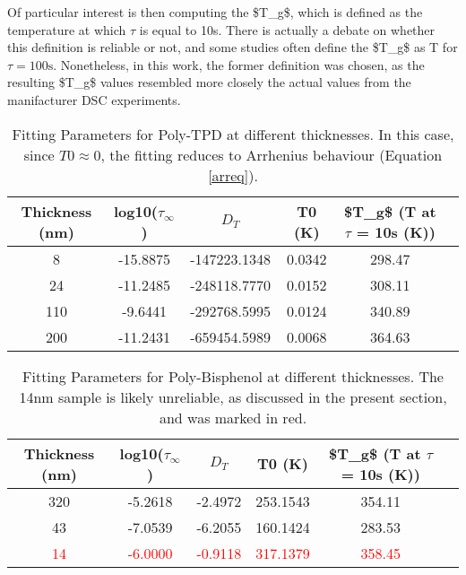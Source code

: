 Of particular interest is then computing the \ac{$T_g$}, which is defined as the temperature at which $\tau$ is equal to 10s.  There is actually a debate on whether this definition is reliable or not, and some studies often define the \ac{$T_g$} as T for $\tau = \text{100s}$. Nonetheless, in this work, the former definition was chosen, as the resulting \ac{$T_g$} values resembled more closely the actual values from the manifacturer \ac{DSC} experiments. %


\begin{table}[h]
	\caption{Fitting Parameters for Poly-TPD at different thicknesses. In this case, since $T0 \approx 0$, the fitting reduces to Arrhenius behaviour (Equation \ref{arreq}).}
    \label{tab:fitting-parameters-ptpd}
    \begin{center}
    \begin{tabular}{@{}cccccc@{}}
    \toprule
    Thickness (nm) & log10($\tau_\infty$) & $D_T$ & T0 (K) & \ac{$T_g$} (T at $\tau$ = 10s (K)) \\ \midrule
    8   & -15.8875 & -147223.1348 & 0.0342 & 298.47 \\
    24  & -11.2485 & -248118.7770 & 0.0152 & 308.11 \\
    110 & -9.6441 & -292768.5995 & 0.0124 & 340.89 \\
    200 & -11.2431 & -659454.5989 & 0.0068 & 364.63 \\
    \bottomrule
    \end{tabular}
    \end{center}
\end{table}



\begin{table}[h]
    \caption{Fitting Parameters for Poly-Bisphenol at different thicknesses. The 14nm sample is likely unreliable, as discussed in the present section, and was marked in red.}
    \label{tab:fitting-parameters-bisphenol}
    \begin{center}
    \begin{tabular}{@{}cccccc@{}}
    \toprule
    Thickness (nm) & log10($\tau_\infty$) & $D_T$ & T0 (K) & \ac{$T_g$} (T at $\tau$ = 10s (K)) \\ \midrule
    320 & -5.2618 & -2.4972 & 253.1543 & 354.11 \\
    43  & -7.0539 & -6.2055 & 160.1424 & 283.53 \\
    \textcolor{red}{14}  & \textcolor{red}{-6.0000} & \textcolor{red}{-0.9118} & \textcolor{red}{317.1379} & \textcolor{red}{358.45} \\ %
    \bottomrule
    \end{tabular}
    \end{center}
\end{table}

